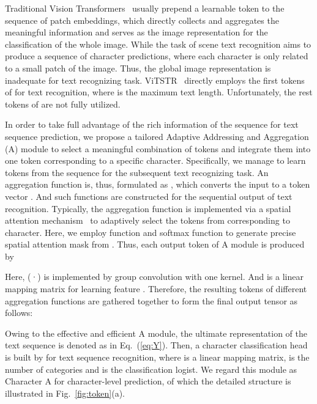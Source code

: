 \documentclass[runningheads]{llncs}
\begin{document}
Traditional Vision Transformers~\cite{dosovitskiy2020image,deit} usually prepend a learnable  token to the sequence of patch embeddings, which directly collects and aggregates the meaningful information and serves as the image representation for the classification of the whole image.
While the task of scene text recognition aims to produce a sequence of character predictions, where each character is only related to a small patch of the image.
Thus, the global image representation   is inadequate for text recognizing task.
ViTSTR~\cite{ViTSTR} directly employs the first  tokens of   for text recognition, where   is the maximum text length. Unfortunately, the rest tokens of  are not fully utilized.

In order to take full advantage of the rich information of the sequence  for text sequence prediction, 
we propose a tailored Adaptive Addressing and Aggregation (A)  module to select a  meaningful combination of tokens  and integrate them into one token corresponding to a specific character.
Specifically, we manage to learn  tokens  from the sequence  for the subsequent text recognizing task.
An aggregation function is, thus, formulated as , which converts the input   to a token vector . And  such  functions are constructed for the sequential output of text recognition.
Typically, the aggregation function  is implemented via a spatial attention mechanism~\cite{tokenlearner} to adaptively select the tokens from  corresponding  to  character.
Here, we employ function  and softmax function to generate precise spatial attention 
mask  from .
Thus, each output token  of A module is produced by 

Here, (·) is implemented by group convolution with one  kernel. And   is a linear mapping matrix for learning feature . Therefore, the resulting tokens of different aggregation functions are gathered together to form the final output tensor as follows:


Owing to the effective and efficient  A module, the ultimate
representation of the text sequence is denoted as  in Eq.~(\ref{eq:Y}). Then, a character classification head is built by  for text sequence recognition, where  is a linear mapping matrix,  is the number of categories and  is the classification logist. 
We regard this module as Character  A for character-level prediction, of which the detailed structure is illustrated in Fig.~\ref{fig:token}(a). 
\end{document}
